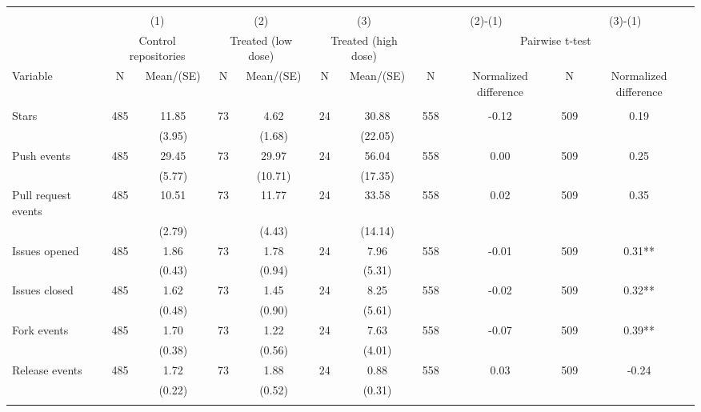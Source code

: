\begin{tabular}{@{\extracolsep{5pt}}lcccccccccc}
\\[-1.8ex]\hline \hline \\[-1.8ex]
 & \multicolumn{2}{c}{(1)}  & \multicolumn{2}{c}{(2)}  & \multicolumn{2}{c}{(3)}  & \multicolumn{2}{c}{(2)-(1)} & \multicolumn{2}{c}{(3)-(1)} \\
 & \multicolumn{2}{c}{Control repositories}  & \multicolumn{2}{c}{Treated (low dose)}  & \multicolumn{2}{c}{Treated (high dose)}  & \multicolumn{4}{c}{Pairwise t-test}  \\
Variable & N & Mean/(SE) & N & Mean/(SE) & N & Mean/(SE) & N & Normalized difference & N & Normalized difference \\ \hline \\[-1.8ex] 
Stars   & 485    & 11.85    & 73    & 4.62    & 24    & 30.88    & 558    & -0.12    & 509    & 0.19   \\
 &   & (3.95)  &   & (1.68)  &   & (22.05)  &   &  &   &  \\ [1ex]
Push events   & 485    & 29.45    & 73    & 29.97    & 24    & 56.04    & 558    & 0.00    & 509    & 0.25   \\
 &   & (5.77)  &   & (10.71)  &   & (17.35)  &   &  &   &  \\ [1ex]
Pull request events   & 485    & 10.51    & 73    & 11.77    & 24    & 33.58    & 558    & 0.02    & 509    & 0.35   \\
 &   & (2.79)  &   & (4.43)  &   & (14.14)  &   &  &   &  \\ [1ex]
Issues opened   & 485    & 1.86    & 73    & 1.78    & 24    & 7.96    & 558    & -0.01    & 509    & 0.31**   \\
 &   & (0.43)  &   & (0.94)  &   & (5.31)  &   &  &   &  \\ [1ex]
Issues closed   & 485    & 1.62    & 73    & 1.45    & 24    & 8.25    & 558    & -0.02    & 509    & 0.32**   \\
 &   & (0.48)  &   & (0.90)  &   & (5.61)  &   &  &   &  \\ [1ex]
Fork events   & 485    & 1.70    & 73    & 1.22    & 24    & 7.63    & 558    & -0.07    & 509    & 0.39**   \\
 &   & (0.38)  &   & (0.56)  &   & (4.01)  &   &  &   &  \\ [1ex]
Release events   & 485    & 1.72    & 73    & 1.88    & 24    & 0.88    & 558    & 0.03    & 509    & -0.24   \\
 &   & (0.22)  &   & (0.52)  &   & (0.31)  &   &  &   &  \\ [1ex]
\hline \hline \\[-1.8ex]

\end{tabular}
